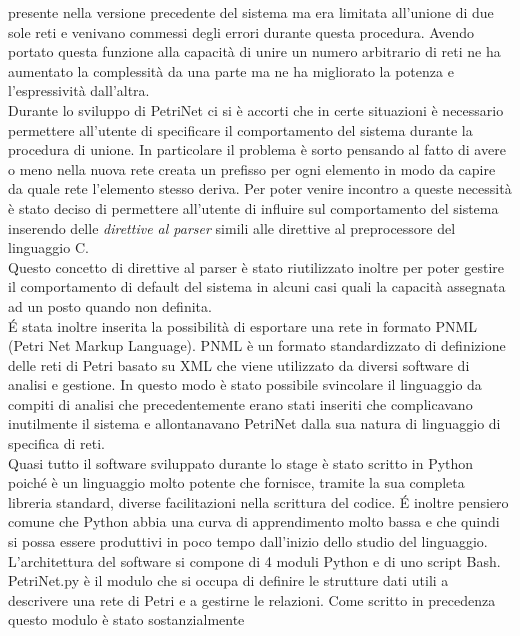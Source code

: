 \documentclass[italian,12pt]{report}
\begin{document}
 presente nella versione precedente del sistema ma era limitata all'unione di due sole reti e 
 venivano commessi degli errori durante questa procedura. Avendo portato questa funzione alla 
 capacità di unire un numero arbitrario di reti ne ha aumentato la complessità da una parte ma ne ha 
 migliorato la potenza e l'espressività dall'altra. \\
 Durante lo sviluppo di PetriNet ci si è accorti che in certe situazioni è necessario permettere 
 all'utente di specificare il comportamento del sistema  durante la procedura di unione. In particolare 
 il problema è sorto pensando al fatto di avere o meno nella nuova rete
 creata un prefisso per ogni elemento in modo da capire da quale rete l'elemento stesso deriva. 
 Per poter venire incontro a queste necessità è stato deciso di permettere all'utente di influire sul 
 comportamento del sistema inserendo delle \emph{direttive al parser} simili alle direttive 
 al preprocessore del linguaggio C. \\
 Questo concetto di direttive al parser è stato riutilizzato inoltre per poter gestire il comportamento 
 di default del sistema in alcuni casi quali la capacità assegnata ad un posto quando non definita. \\
 \'E stata inoltre inserita la possibilità di esportare una rete in formato PNML (Petri Net Markup 
 Language). PNML è un formato standardizzato di definizione delle reti di Petri basato su XML 
 che viene utilizzato da diversi software di analisi e gestione. In questo modo è stato possibile 
 svincolare il linguaggio da compiti di analisi che precedentemente erano stati inseriti che 
 complicavano inutilmente il sistema e allontanavano PetriNet dalla sua natura 
 di linguaggio di specifica di reti.\\
 Quasi tutto il software sviluppato durante lo stage è stato scritto in Python poiché è un linguaggio
 molto potente che fornisce, tramite la sua completa libreria standard, diverse facilitazioni
 nella scrittura del codice. \'E inoltre pensiero comune che Python abbia una curva di apprendimento 
 molto bassa e che quindi si possa essere produttivi in poco tempo dall'inizio dello studio del
 linguaggio. \\
 L'architettura del software si compone di 4 moduli Python e di uno script Bash. \\
 PetriNet.py è il modulo che si occupa di definire le strutture dati utili a descrivere una rete di Petri
 e a gestirne le relazioni. Come scritto in precedenza questo modulo è stato sostanzialmente 
\end{document}
